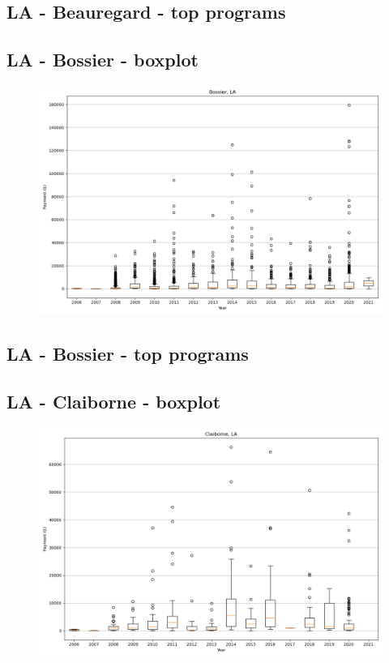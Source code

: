 \subsection*{LA - Beauregard - top programs}

\newpage
\subsection*{LA - Bossier - boxplot}
\begin{figure}[h]
\centering
\includegraphics[width=7in]{../output/boxplots/counties/Bossier-LA_boxplot.png}
\end{figure}


\subsection*{LA - Bossier - top programs}

\newpage
\subsection*{LA - Claiborne - boxplot}
\begin{figure}[h]
\centering
\includegraphics[width=7in]{../output/boxplots/counties/Claiborne-LA_boxplot.png}
\end{figure}


